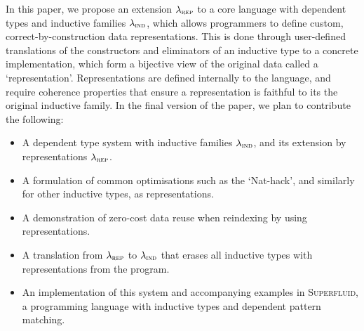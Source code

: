 In this paper, we propose an extension $\lambda_{\textsc{rep}}$ to a core language with
dependent types and inductive families $\lambda_{\textsc{ind}}$, which allows programmers to
define custom, correct-by-construction data representations. This is done
through user-defined translations of the constructors and eliminators of an
inductive type to a concrete implementation, which form a bijective view of the
original data called a `representation'. Representations are defined internally
to the language, and require coherence properties that ensure a representation
is faithful to its the original inductive family. In the final version of
the paper, we plan to contribute the following:
\begin{itemize}
  \item A dependent type system with inductive families $\lambda_{\textsc{ind}}$,
    and its extension by representations $\lambda_{\textsc{rep}}$.
  \item A formulation of common optimisations such as the `Nat-hack', and
      similarly for other inductive types, as representations.
  \item A demonstration of zero-cost data reuse when reindexing by using representations.
  \item A translation from $\lambda_{\textsc{rep}}$ to $\lambda_{\textsc{ind}}$ that erases all
    inductive types with representations from the program.
  \item An implementation of this system and accompanying examples in
    \textsc{Superfluid}, a programming language with inductive types and
    dependent pattern matching.
\end{itemize}

